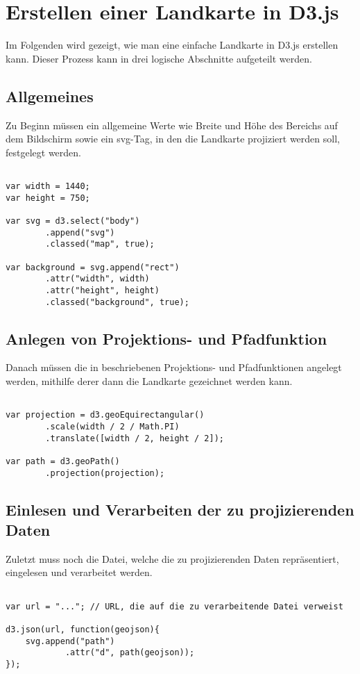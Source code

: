 \chapter{Erstellen einer Landkarte in D3.js}
\label{ch:map-in-d3js}

Im Folgenden wird gezeigt, wie man eine einfache Landkarte in D3.js erstellen kann. Dieser Prozess kann in drei logische Abschnitte aufgeteilt werden.

\section{Allgemeines}
\label{sec:map-abstract}

Zu Beginn müssen ein allgemeine Werte wie Breite und Höhe des Bereichs auf dem Bildschirm sowie ein svg-Tag, in den die Landkarte projiziert werden soll, festgelegt werden.

\begin{lstlisting}

var width = 1440;
var height = 750;

var svg = d3.select("body")
        .append("svg")
        .classed("map", true);

var background = svg.append("rect")
        .attr("width", width)
        .attr("height", height)
        .classed("background", true);

\end{lstlisting}

\section{Anlegen von Projektions- und Pfadfunktion}
\label{sec:map-setup}

Danach müssen die in beschriebenen Projektions- und Pfadfunktionen angelegt werden, mithilfe derer dann die Landkarte gezeichnet werden kann.

\begin{lstlisting}

var projection = d3.geoEquirectangular()
        .scale(width / 2 / Math.PI)
        .translate([width / 2, height / 2]);

var path = d3.geoPath()
        .projection(projection);

\end{lstlisting}

\section{Einlesen und Verarbeiten der zu projizierenden Daten}

Zuletzt muss noch die Datei, welche die zu projizierenden Daten repräsentiert, eingelesen und verarbeitet werden.

\begin{lstlisting}

var url = "..."; // URL, die auf die zu verarbeitende Datei verweist

d3.json(url, function(geojson){
    svg.append("path")
            .attr("d", path(geojson));
});

\end{lstlisting}